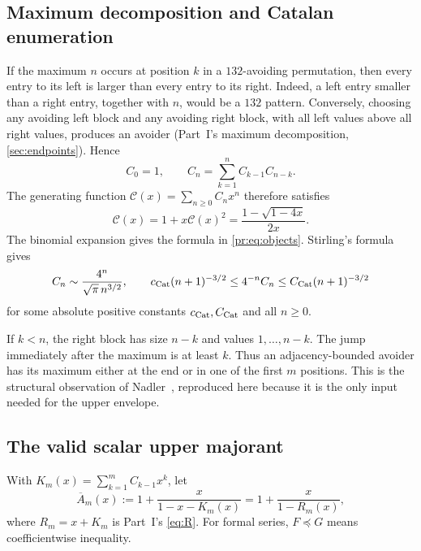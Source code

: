 \documentclass[11pt,a4paper]{article}
\theoremstyle{definition}\newaliascnt{definition}{theorem}
\theoremstyle{remark}\newaliascnt{remark}{theorem}
\newcommand{\Cat}{\mathcal C}
\newcommand{\preceqc}{\preceq}
\begin{document}
\subsection{Maximum decomposition and Catalan enumeration}
If the maximum $n$ occurs at position $k$ in a $132$-avoiding permutation,
then every entry to its left is larger than every entry to its right.
Indeed, a left entry smaller than a right entry, together with $n$, would be
a $132$ pattern. Conversely, choosing any avoiding left block and any
avoiding right block, with all left values above all right values, produces
an avoider (Part~I's maximum decomposition, \cref{sec:endpoints}). Hence
\begin{equation}
 C_0=1,\qquad C_n=\sum_{k=1}^n C_{k-1}C_{n-k}.
 \label{pr:eq:catalanrec}
\end{equation}
The generating function $\Cat(x)=\sum_{n\ge0}C_nx^n$ therefore satisfies
\begin{equation}
 \Cat(x)=1+x\Cat(x)^2
 =\frac{1-\sqrt{1-4x}}{2x}.
 \label{pr:eq:catgf}
\end{equation}
The binomial expansion gives the formula in \eqref{pr:eq:objects}.
Stirling's formula gives
\begin{equation}
 C_n\sim\frac{4^n}{\sqrt\pi\,n^{3/2}},
 \qquad
 c_{\rm Cat}(n+1)^{-3/2}\le4^{-n}C_n\le C_{\rm Cat}(n+1)^{-3/2}
 \label{pr:eq:catasymp}
\end{equation}
for some absolute positive constants $c_{\rm Cat},C_{\rm Cat}$ and all
$n\ge0$.

If $k<n$, the right block has size $n-k$ and values $1,\ldots,n-k$. The jump
immediately after the maximum is at least $k$. Thus an adjacency-bounded
avoider has its maximum either at the end or in one of the first $m$
positions. This is the structural observation of Nadler~\cite{Nadler},
reproduced here because it is the only input needed for the upper envelope.

\subsection{The valid scalar upper majorant}
With $K_m(x)=\sum_{k=1}^mC_{k-1}x^k$, let
\begin{equation}
 \overline A_m(x):=1+\frac{x}{1-x-K_m(x)}=1+\frac{x}{1-R_m(x)},
 \label{pr:eq:KandB}
\end{equation}
where $R_m=x+K_m$ is Part~I's \eqref{eq:R}. For formal series, $F\preceqc G$
means coefficientwise inequality.
\end{document}
